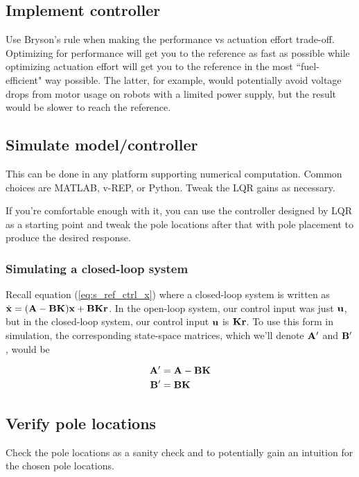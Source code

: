 \subsection{Implement controller}

Use Bryson's rule when making the performance vs actuation effort trade-off.
Optimizing for performance will get you to the reference as fast as possible
while optimizing actuation effort will get you to the reference in the most
``fuel-efficient" way possible. The latter, for example, would potentially avoid
voltage drops from motor usage on robots with a limited power supply, but the
result would be slower to reach the reference.

\subsection{Simulate model/controller}

This can be done in any platform supporting numerical computation. Common
choices are MATLAB, v-REP, or Python. Tweak the LQR gains as necessary.

If you're comfortable enough with it, you can use the controller designed by LQR
as a starting point and tweak the pole locations after that with pole placement
to produce the desired response.

\subsubsection{Simulating a closed-loop system}

Recall equation (\ref{eq:s_ref_ctrl_x}) where a closed-loop system is written as
$\dot{\mathbf{x}} = (\mathbf{A} - \mathbf{B}\mathbf{K})\mathbf{x} + \mathbf{B}\mathbf{K}\mathbf{r}$. In
the open-loop system, our control input was just $\mathbf{u}$, but in the
closed-loop system, our control input $\mathbf{u}$ is $\mathbf{K}\mathbf{r}$. To use this
form in simulation, the corresponding state-space matrices, which we'll denote
$\mathbf{A}'$ and $\mathbf{B}'$, would be

\begin{align*}
  \mathbf{A}' &= \mathbf{A} - \mathbf{B}\mathbf{K} \\
  \mathbf{B}' &= \mathbf{B}\mathbf{K}
\end{align*}

\subsection{Verify pole locations}

Check the pole locations as a sanity check and to potentially gain an intuition
for the chosen pole locations.

